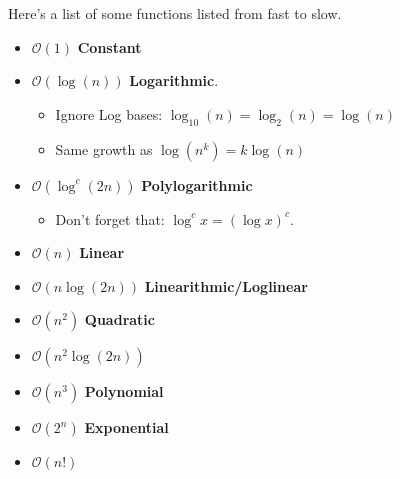 \documentclass{exam}
\begin{document}
Here's a list of some functions listed from fast to slow.
\begin{itemize}
    \item[] $\mathcal{O}(1)$ \textbf{Constant}
    \item[] $\mathcal{O}(\log(n))$ \textbf{Logarithmic}. 
    \begin{itemize}
        \item[] Ignore Log bases: $\log_{10}(n)=\log_{2}(n)=\log(n)$
        \item[] Same growth as $\log(n^{k})=k\log(n)$ 
    \end{itemize}
    
    \item[] $\mathcal{O}(\log^{c}(2n))$ \textbf{Polylogarithmic}
    \begin{itemize}
        \item[] Don't forget that: $\log^{c}x=(\log x)^{c}$.
    \end{itemize}
    \item[] $\mathcal{O}(n)$ \textbf{Linear}
    \item[] $\mathcal{O}(n\log(2n))$ \textbf{Linearithmic/Loglinear}
    \item[] $\mathcal{O}(n^{2})$ \textbf{Quadratic}
    \item[] $\mathcal{O}(n^{2}\log(2n))$
    \item[] $\mathcal{O}(n^{3})$ \textbf{Polynomial}
    \item[] $\mathcal{O}(2^{n})$ \textbf{Exponential} 
    \item[] $\mathcal{O}(n!)$
\end{itemize}

\newpage
\end{document}
